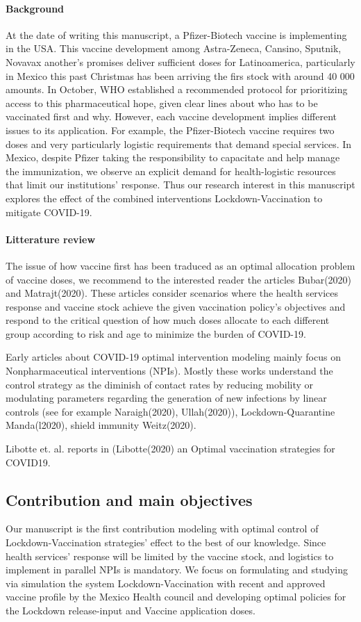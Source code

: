 \paragraph{Background}
 At the date of writing this manuscript, a Pfizer-Biotech vaccine is
implementing in the USA. This vaccine development among Astra-Zeneca, Cansino,
Sputnik, Novavax another's promises deliver sufficient doses for
Latinoamerica, particularly in Mexico this past Christmas has been arriving
the firs stock with around 40 000 amounts. In October, WHO established a
recommended protocol for prioritizing access to this pharmaceutical hope,
given clear lines about who has to be vaccinated first and why.
However, each vaccine development implies different issues to its application.
For example, the Pfizer-Biotech vaccine requires two doses and very
particularly logistic requirements that demand special services. In Mexico,
despite Pfizer taking the responsibility to capacitate and help manage the
immunization, we observe an explicit demand for health-logistic resources that
limit our institutions' response. Thus our research interest in this manuscript
explores the effect of the combined interventions Lockdown-Vaccination to
mitigate COVID-19.


\paragraph{Litterature review}
    The issue of how vaccine first has been traduced as an optimal allocation
problem of vaccine doses, we recommend to the interested reader the
articles Bubar(2020) and  Matrajt(2020).  These articles consider scenarios
where the health services response and vaccine stock achieve the given
vaccination policy's objectives and respond to the critical question of how
much doses allocate to each different group according to risk and age to
minimize the burden of COVID-19.

    Early articles about COVID-19 optimal intervention modeling mainly focus on
Nonpharmaceutical interventions (NPIs). Mostly these works understand the
control strategy as the diminish of contact rates by reducing mobility or
modulating parameters regarding the generation of new infections by linear
controls (see for example Naraigh(2020),  Ullah(2020)), Lockdown-Quarantine
Manda(l2020),  shield immunity Weitz(2020).

    Libotte et. al. reports in (Libotte(2020) an Optimal vaccination strategies
for COVID19.
\subsection{Contribution and main objectives}
    Our manuscript is the first contribution modeling with optimal control of
    Lockdown-Vaccination strategies' effect to the best of our knowledge. Since
    health services' response will be limited by the vaccine stock, and
    logistics to implement in parallel NPIs is mandatory. We focus on
    formulating and studying via simulation the system Lockdown-Vaccination
    with recent and approved vaccine profile by the  Mexico Health council and
    developing optimal policies for the Lockdown release-input and Vaccine
    application doses.
